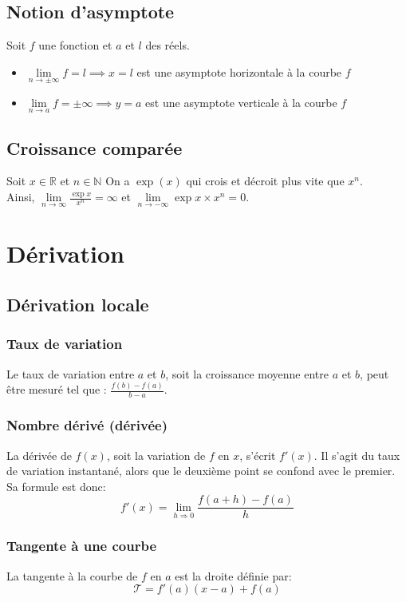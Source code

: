 \documentclass{article}
\begin{document}
\subsection{Notion d'asymptote}
Soit $f$ une fonction et $a$ et $l$ des réels.
\begin{itemize}
	\item $\lim \limits_{n \rightarrow \pm \infty} f = l \implies x=l$ est une asymptote horizontale à la courbe $f$
	\item $\lim \limits_{n \rightarrow a} f = \pm \infty \implies y=a$ est une asymptote verticale à la courbe $f$
\end{itemize}

\subsection{Croissance comparée}
Soit $x\in\mathbb{R}$ et $n\in\mathbb{N}$
On a $\exp(x)$ qui crois et décroit plus vite que $x^n$.\\
Ainsi, $\lim \limits_{n \rightarrow \infty} \frac{\exp{x}}{x^n} = \infty$ et $\lim \limits_{n \rightarrow -\infty} \exp{x}\times x^n = 0$.


\section{Dérivation}
\subsection{Dérivation locale}

\subsubsection{Taux de variation}
Le taux de variation entre $a$ et $b$, soit la croissance moyenne entre $a$ et $b$, peut être mesuré tel que : $\frac{f(b) - f(a)}{b - a}$.\\

\subsubsection{Nombre dérivé (dérivée)}
La dérivée de $f(x)$, soit la variation de $f$ en $x$, s'écrit $f'(x)$. Il s'agit du taux de variation instantané, alors que le deuxième point se confond avec le premier. Sa formule est donc:
$$f'(x) = \lim \limits_{h \Rightarrow 0} \frac{f(a + h) - f(a)}{h}$$

\subsubsection{Tangente à une courbe}
La tangente à la courbe de $f$ en $a$ est la droite définie par: $$\mathcal{T} = f'(a)(x-a) + f(a)$$
\end{document}
